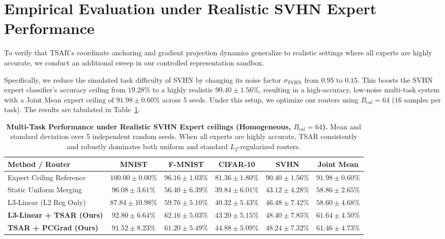 \section{Empirical Evaluation under Realistic SVHN Expert Performance}
\label{sec:realistic_svhn_performance}

To verify that TSAR's coordinate anchoring and gradient projection dynamics generalize to realistic settings where all experts are highly accurate, we conduct an additional sweep in our controlled representation sandbox. 

Specifically, we reduce the simulated task difficulty of SVHN by changing its noise factor $\sigma_{\text{SVHN}}$ from $0.95$ to $0.15$. This boosts the SVHN expert classifier's accuracy ceiling from $19.28\%$ to a highly realistic $90.40 \pm 1.56\%$, resulting in a high-accuracy, low-noise multi-task system with a Joint Mean expert ceiling of $91.98 \pm 0.60\%$ across 5 seeds. Under this setup, we optimize our routers using $B_{cal}=64$ ($16$ samples per task). The results are tabulated in Table~\ref{tab:realistic_svhn_table}.

\begin{table}[t]
\caption{\textbf{Multi-Task Performance under Realistic SVHN Expert ceilings (Homogeneous, $B_{cal}=64$).} Mean and standard deviation over 5 independent random seeds. When all experts are highly accurate, TSAR consistently and robustly dominates both uniform and standard $L_2$-regularized routers.}
\label{tab:realistic_svhn_table}
\vskip 0.15in
\begin{center}
\begin{small}
\begin{sc}
\setlength{\tabcolsep}{4pt}
\begin{tabular}{lccccc}
\toprule
Method / Router & MNIST & F-MNIST & CIFAR-10 & SVHN & Joint Mean \\
\midrule
Expert Ceiling Reference & $100.00 \pm 0.00\%$ & $96.16 \pm 1.03\%$ & $81.36 \pm 1.80\%$ & $90.40 \pm 1.56\%$ & $91.98 \pm 0.60\%$ \\
\midrule
Static Uniform Merging & $96.08 \pm 3.61\%$ & $56.40 \pm 6.39\%$ & $39.84 \pm 6.01\%$ & $43.12 \pm 4.28\%$ & $58.86 \pm 2.65\%$ \\
L3-Linear (L2 Reg Only) & $87.84 \pm 10.98\%$ & $59.76 \pm 5.10\%$ & $40.32 \pm 5.43\%$ & $46.48 \pm 7.42\%$ & $58.60 \pm 4.68\%$ \\
\midrule
\textbf{L3-Linear + TSAR (Ours)} & $\mathbf{92.80 \pm 6.64\%}$ & $\mathbf{62.16 \pm 5.03\%}$ & $43.20 \pm 5.15\%$ & $\mathbf{48.40 \pm 7.85\%}$ & $\mathbf{61.64 \pm 4.50\%}$ \\
\textbf{TSAR + PCGrad (Ours)} & $91.52 \pm 8.23\%$ & $61.20 \pm 5.49\%$ & $\mathbf{44.88 \pm 5.09\%}$ & $48.24 \pm 7.32\%$ & $61.46 \pm 4.73\%$ \\
\bottomrule
\end{tabular}
\end{sc}
\end{small}
\end{center}
\vskip -0.1in
\end{table}

